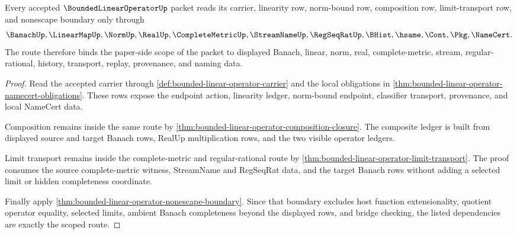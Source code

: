 \begin{theorem}
\label{thm:bounded-linear-operator-scoped-dependency-route}
Every accepted $\BoundedLinearOperatorUp$ packet reads its carrier, linearity row, norm-bound row, composition row, limit-transport row, and nonescape boundary only through
$$
\BanachUp,\LinearMapUp,\NormUp,\RealUp,\CompleteMetricUp,\StreamNameUp,\RegSeqRatUp,\BHist,\hsame,\Cont,\Pkg,\NameCert .
$$
The route therefore binds the paper-side scope of the packet to displayed Banach, linear, norm, real, complete-metric, stream, regular-rational, history, transport, replay, provenance, and naming data.
\end{theorem}
\begin{proof}
Read the accepted carrier through \autoref{def:bounded-linear-operator-carrier} and the local obligations in \autoref{thm:bounded-linear-operator-namecert-obligations}. These rows expose the endpoint action, linearity ledger, norm-bound endpoint, classifier transport, provenance, and local NameCert data.

Composition remains inside the same route by \autoref{thm:bounded-linear-operator-composition-closure}. The composite ledger is built from displayed source and target Banach rows, RealUp multiplication rows, and the two visible operator ledgers.

Limit transport remains inside the complete-metric and regular-rational route by \autoref{thm:bounded-linear-operator-limit-transport}. The proof consumes the source complete-metric witness, StreamName and RegSeqRat data, and the target Banach rows without adding a selected limit or hidden completeness coordinate.

Finally apply \autoref{thm:bounded-linear-operator-nonescape-boundary}. Since that boundary excludes host function extensionality, quotient operator equality, selected limits, ambient Banach completeness beyond the displayed rows, and bridge checking, the listed dependencies are exactly the scoped route.
\end{proof}


